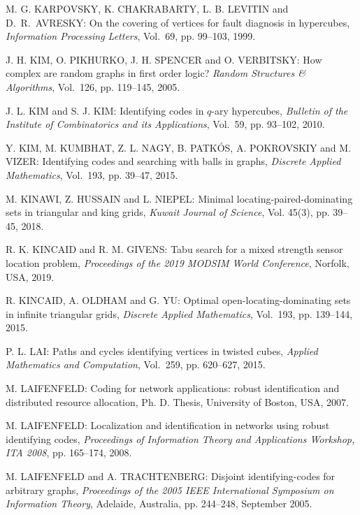 \begin{thebibliography}{999}
M. G. KARPOVSKY, K. CHAKRABARTY, L. B. LEVITIN and D.~R.~AVRESKY: On the covering of vertices for fault diagnosis in hypercubes, {\it Information Processing Letters}, Vol.~69, pp. 99--103, 1999.
%

J. H. KIM, O. PIKHURKO, J. H. SPENCER and O. VERBITSKY: How complex are random graphs in first order logic? {\it Random Structures \& Algorithms}, Vol.~126, pp. 119--145, 2005.

J. L. KIM and S. J. KIM: Identifying codes in $q$-ary hypercubes, {\it Bulletin of the Institute of Combinatorics and its Applications}, Vol.~59, pp. 93--102, 2010.

Y. KIM, M. KUMBHAT, Z. L. NAGY, B. PATK\'OS, A. POKROVSKIY and M. VIZER: Identifying codes and searching with balls in graphs, {\it Discrete Applied Mathematics}, Vol.~193, pp. 39--47, 2015.

M. KINAWI, Z. HUSSAIN and L. NIEPEL: Minimal locating-paired-dominating sets in triangular and king grids, {\it Kuwait Journal of Science}, Vol. 45(3), pp. 39--45, 2018.

R. K. KINCAID and R. M. GIVENS: Tabu search for a mixed strength sensor location problem, {\it Proceedings of the 2019 MODSIM World Conference}, Norfolk, USA, 2019.

R. KINCAID, A. OLDHAM and G. YU: Optimal open-locating-dominating sets in infinite triangular grids, {\it Discrete Applied Mathematics}, Vol.~193, pp. 139--144, 2015.

P. L. LAI: Paths and cycles identifying vertices in twisted cubes, {\it Applied Mathematics and Computation}, Vol.~259, pp. 620--627, 2015.

M. LAIFENFELD: Coding for network applications: robust identification and distributed resource allocation, Ph. D. Thesis, University of Boston, USA, 2007. 

M. LAIFENFELD: Localization and identification in networks using robust identifying codes, {\it Proceedings of Information Theory and Applications Workshop, ITA 2008}, pp. 165--174, 2008.

M. LAIFENFELD and A. TRACHTENBERG: Disjoint identifying-codes for arbitrary graphs, {\it Proceedings of the 2005 IEEE International Symposium on Information Theory}, Adelaide, Australia, pp. 244--248, September 2005.


\end{thebibliography}
